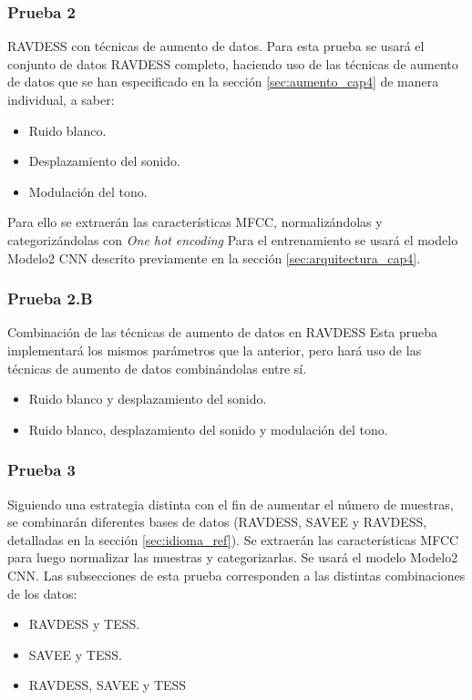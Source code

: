 \documentclass[11pt,a4paper,spanish]{book}
\begin{document}
	\subsubsection{Prueba 2}
	RAVDESS con técnicas de aumento de datos.
	Para esta prueba se usará el conjunto de datos RAVDESS completo, haciendo uso de las técnicas de aumento de datos que se han especificado en la sección \ref{sec:aumento_cap4} de manera individual, a saber:
	\begin{itemize}
		\item Ruido blanco.
		\item Desplazamiento del sonido.
		\item Modulación del tono.
	\end{itemize}
	Para ello se extraerán las características MFCC, normalizándolas y categorizándolas con \emph{One hot encoding}
	Para el entrenamiento se usará el modelo Modelo2 CNN descrito previamente en la sección \ref{sec:arquitectura_cap4}.
	
	\subsubsection{Prueba 2.B}
	Combinación de las técnicas de aumento de datos en RAVDESS
	Esta prueba implementará los mismos parámetros que la anterior, pero hará uso de las técnicas de aumento de datos combinándolas entre sí.
	\begin{itemize}
		\item Ruido blanco y desplazamiento del sonido.
		\item Ruido blanco, desplazamiento del sonido y modulación del tono.
	\end{itemize}

	\subsubsection{Prueba 3}
	Siguiendo una estrategia distinta con el fin de aumentar el número de muestras, se combinarán diferentes bases de datos (RAVDESS, SAVEE y RAVDESS, detalladas en la sección \ref{sec:idioma_ref}). Se extraerán las características MFCC para luego normalizar las muestras y categorizarlas.
	Se usará el modelo Modelo2 CNN. Las subsecciones de esta prueba corresponden a las distintas combinaciones de los datos:
	\begin{itemize}
		\item RAVDESS y TESS.
		\item SAVEE y TESS.
		\item RAVDESS, SAVEE y TESS
	\end{itemize}
\end{document}
